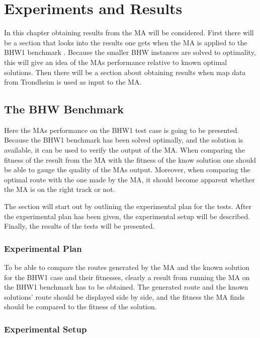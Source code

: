 \chapter{Experiments and Results}
\label{cha:experiments_and_results}

In this chapter obtaining results from the MA will be considered. First there will be a section that looks into the results one gets when the MA is applied to the BHW1 benchmark \citep{BHWdocumentationSINTEF}. Because the smaller BHW instances are solved to optimality, this will give an idea of the MAs performance relative to known optimal solutions. Then there will be a section about obtaining results when map data from Trondheim is used as input to the MA.

\section{The BHW Benchmark}
\label{sec:the_bhw_benchmark}

Here the MAs performance on the BHW1 test case is going to be presented. Because the BHW1 benchmark has been solved optimally, and the solution is available, it can be used to verify the output of the MA. When comparing the fitness of the result from the MA with the fitness of the know solution one should be able to gauge the quality of the MAs output. Moreover, when comparing the optimal route with the one made by the MA, it should become apparent whether the MA is on the right track or not.

The section will start out by outlining the experimental plan for the tests. After the experimental plan has been given, the experimental setup will be described. Finally, the results of the tests will be presented.

\subsection{Experimental Plan}

To be able to compare the routes generated by the MA and the known solution for the BHW1 case and their fitnesses, clearly a result from running the MA on the BHW1 benchmark has to be obtained. The generated route and the known solutions' route should be displayed side by side, and the fitness the MA finds should be compared to the fitness of the solution.

\subsection{Experimental Setup}

